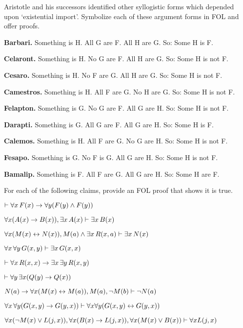 \problempart
\label{pr.BarbaraEtc.proof2}
Aristotle and his successors identified other syllogistic forms which depended upon `existential import'. Symbolize each of these argument forms in FOL and offer proofs.
\begin{compactlist}
	\item \textbf{Barbari.} Something is H. All G are F. All H are G. So: Some H is F.
	\item \textbf{Celaront.} Something is H. No G are F. All H are G. So: Some H is not F.
	\item \textbf{Cesaro.} Something is H. No F are G. All H are G. So: Some H is not F.
	\item \textbf{Camestros.} Something is H. All F are G. No H are G. So: Some H is not F.
	\item \textbf{Felapton.} Something is G. No G are F. All G are H. So: Some H is not F.
	\item \textbf{Darapti.} Something is G. All G are F. All G are H. So: Some H is F.
	\item \textbf{Calemos.} Something is H. All F are G. No G are H. So: Some H is not F.
	\item \textbf{Fesapo.} Something is G. No F is G. All G are H. So: Some H is not F.
	\item \textbf{Bamalip.} Something is F. All F are G. All G are H. So: Some H are F.
\end{compactlist}

\problempart
\label{pr.someFOLproofs}
For each of the following claims, provide an FOL proof that shows it
is true.
\begin{compactlist}
\item $\vdash \forall x\,\mathord{F}(x) \rightarrow \forall y(\mathord{F}(y) \wedge \mathord{F}(y))$
\item $\forall x(\mathord{A}(x)\rightarrow \mathord{B}(x)), \exists x\,\mathord{A}(x) \vdash \exists x\,\mathord{B}(x)$
\item $\forall x(\mathord{M}(x) \leftrightarrow \mathord{N}(x)), \mathord{M}(a) \wedge \exists x\,\mathord{R}(x,a) \vdash \exists x\,\mathord{N}(x)$
\item $\forall x\, \forall y\,\mathord{G}(x,y)\vdash\exists x\,\mathord{G}(x,x)$
\item $\vdash\forall x\,\mathord{R}(x,x) \rightarrow \exists x\, \exists y\,\mathord{R}(x,y)$
\item $\vdash\forall y\, \exists x (\mathord{Q}(y) \rightarrow \mathord{Q}(x))$
\item $\mathord{N}(a) \rightarrow \forall x(\mathord{M}(x) \leftrightarrow \mathord{M}(a)), \mathord{M}(a), \neg\mathord{M}(b)\vdash \neg \mathord{N}(a)$
\item $\forall x\, \forall y (\mathord{G}(x,y) \rightarrow \mathord{G}(y,x)) \vdash \forall x\forall y (\mathord{G}(x,y) \leftrightarrow \mathord{G}(y,x))$
\item $\forall x(\neg\mathord{M}(x) \vee \mathord{L}(j,x)), \forall x(\mathord{B}(x)\rightarrow \mathord{L}(j,x)), \forall x(\mathord{M}(x)\vee \mathord{B}(x))\vdash \forall x\mathord{L}(j,x)$
\end{compactlist}

